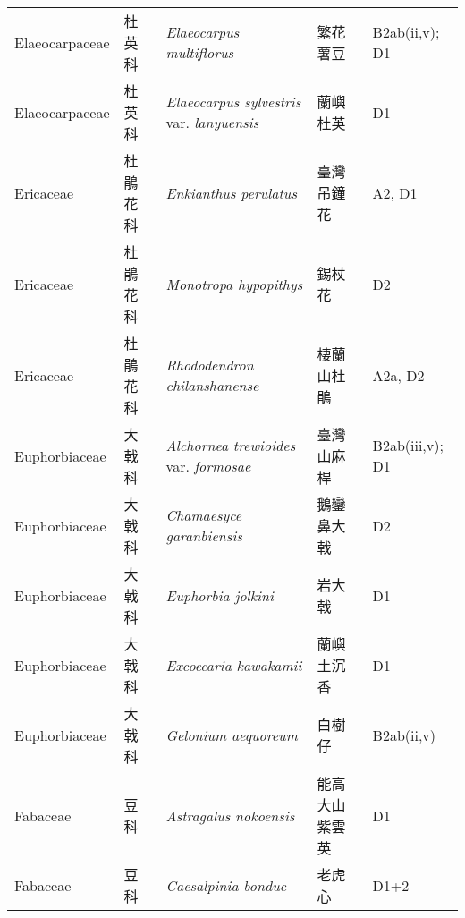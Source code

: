 {\begin{longtable}{p{2.5cm}p{2.5cm}p{4.5cm}p{2.5cm}p{3cm}}
    Elaeocarpaceae & 杜英科 & \textit{Elaeocarpus multiflorus}  & 繁花薯豆 & B2ab(ii,v); D1 \index{Elaeocarpus@\textit{Elaeocarpus}!multiflorus@\textit{multiflorus}}  \index{繁花薯豆} \\
    Elaeocarpaceae & 杜英科 & \textit{Elaeocarpus sylvestris} var. \textit{lanyuensis}  & 蘭嶼杜英 & D1 \index{Elaeocarpus@\textit{Elaeocarpus}!sylvestris@\textit{sylvestris}!var. lanyuensis@var. \textit{lanyuensis}}  \index{蘭嶼杜英} \\
    Ericaceae & 杜鵑花科 & \textit{Enkianthus perulatus}  & 臺灣吊鐘花 & A2, D1 \index{Enkianthus@\textit{Enkianthus}!perulatus@\textit{perulatus}}  \index{臺灣吊鐘花} \\
    Ericaceae & 杜鵑花科 & \textit{Monotropa hypopithys}  & 錫杖花 & D2 \index{Monotropa@\textit{Monotropa}!hypopithys@\textit{hypopithys}}  \index{錫杖花} \\
    Ericaceae & 杜鵑花科 & \textit{Rhododendron chilanshanense}  & 棲蘭山杜鵑 & A2a, D2 \index{Rhododendron@\textit{Rhododendron}!chilanshanense@\textit{chilanshanense}}  \index{棲蘭山杜鵑} \\
    Euphorbiaceae & 大戟科 & \textit{Alchornea trewioides} var. \textit{formosae}  & 臺灣山麻桿 & B2ab(iii,v); D1 \index{Alchornea@\textit{Alchornea}!trewioides@\textit{trewioides}!var. formosae@var. \textit{formosae}}  \index{臺灣山麻桿} \\
    Euphorbiaceae & 大戟科 & \textit{Chamaesyce garanbiensis}  & 鵝鑾鼻大戟 & D2 \index{Chamaesyce@\textit{Chamaesyce}!garanbiensis@\textit{garanbiensis}}  \index{鵝鑾鼻大戟} \\
    Euphorbiaceae & 大戟科 & \textit{Euphorbia jolkini}  & 岩大戟 & D1 \index{Euphorbia@\textit{Euphorbia}!jolkini@\textit{jolkini}}  \index{岩大戟} \\
    Euphorbiaceae & 大戟科 & \textit{Excoecaria kawakamii}  & 蘭嶼土沉香 & D1 \index{Excoecaria@\textit{Excoecaria}!kawakamii@\textit{kawakamii}}  \index{蘭嶼土沉香} \\
    Euphorbiaceae & 大戟科 & \textit{Gelonium aequoreum}  & 白樹仔 & B2ab(ii,v) \index{Gelonium@\textit{Gelonium}!aequoreum@\textit{aequoreum}}  \index{白樹仔} \\
    Fabaceae & 豆科 & \textit{Astragalus nokoensis}  & 能高大山紫雲英 & D1 \index{Astragalus@\textit{Astragalus}!nokoensis@\textit{nokoensis}}  \index{能高大山紫雲英} \\
    Fabaceae & 豆科 & \textit{Caesalpinia bonduc}  & 老虎心 & D1+2 \index{Caesalpinia@\textit{Caesalpinia}!bonduc@\textit{bonduc}}  \index{老虎心} \\

\end{longtable}}
